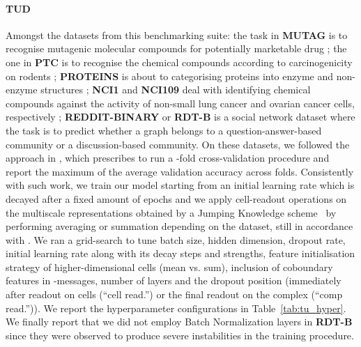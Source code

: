 \documentclass{article}
\begin{document}
\paragraph{TUD} Amongst the datasets from this benchmarking suite: the task in \textbf{MUTAG} is to recognise mutagenic molecular compounds for potentially marketable drug \citep{kazius2005derivation,riesen2008iam}; the one in \textbf{PTC} is to recognise the chemical compounds according to carcinogenicity on rodents \citep{kriege2012subgraph,helma2001predictive}; \textbf{PROTEINS} is about to categorising proteins into enzyme and non-enzyme structures \citep{dobson2003distinguishing,borgwardt2005protein}; \textbf{NCI1} and \textbf{NCI109} deal with identifying chemical compounds against the activity of non-small lung cancer and ovarian cancer cells, respectively \citep{wale2008comparison}; \textbf{REDDIT-BINARY} or \textbf{RDT-B} is a social network dataset where the task is to predict whether a graph belongs to a question-answer-based community or a discussion-based community.
On these datasets, we followed the approach in \citet{GIN}, which prescribes to run a -fold cross-validation procedure and report the maximum of the average validation accuracy across folds. Consistently with such work, we train our model starting from an initial learning rate which is decayed after a fixed amount of epochs and we apply cell-readout operations on the multiscale representations obtained by a Jumping Knowledge scheme~\citep{JK} by performing averaging or summation depending on the dataset, still in accordance with \citet{GIN}. 
We ran a grid-search to tune batch size, hidden dimension, dropout rate, initial learning rate along with its decay steps and strengths, feature initialisation strategy of higher-dimensional cells (mean vs. sum), inclusion of coboundary features in -messages, number of layers and the dropout position (immediately after readout on cells (``cell read.'') or the final readout on the complex (``comp read.'')). We report the hyperparameter configurations in Table~\ref{tab:tu_hyper}. We finally report that we did not employ Batch Normalization layers in \textbf{RDT-B} since they were observed to produce severe instabilities in the training procedure.
\end{document}
